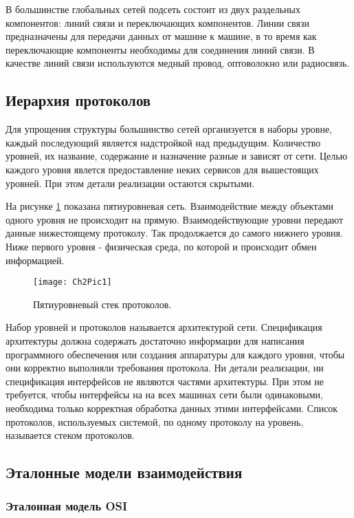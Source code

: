     В большинстве глобальных сетей подсеть состоит из двух раздельных компонентов: линий связи и переключающих компонентов. Линии связи предназначены для передачи данных от машине к машине, в то время как переключающие компоненты необходимы для соединения линий связи. В качестве линий связи используются медный провод, оптоволокно или радиосвязь.

    \subsection{Иерархия протоколов }

    Для упрощения структуры большинство сетей организуется в наборы уровне, каждый последующий является надстройкой над предыдущим. Количество уровней, их название, содержание и назначение разные и зависят от сети. Целью каждого уровня явлется предоставление неких сервисов для вышестоящих уровней. При этом детали реализации остаются скрытыми.

    На рисунке \ref{Pic1} показана пятиуровневая сеть. Взаимодействие между объектами одного уровня не происходит на прямую. Взаимодействующие уровни передают данные нижестоящему протоколу. Так продолжается до самого нижнего уровня. Ниже первого уровня - физическая среда, по которой и происходит обмен информацией.

    \begin{figure}
        \texttt{[image: Ch2Pic1]}
        \caption{Пятиуровневый стек протоколов.} \label{Pic1}
    \end{figure}

    Набор уровней и протоколов называется архитектурой сети. Спецификация архитектуры должна содержать достаточно информации для написания программного обеспечения или создания аппаратуры для каждого уровня, чтобы они корректно выполняли требования протокола. Ни детали реализации, ни спецификация интерфейсов не являются частями архитектуры. При этом не требуется, чтобы интерфейсы на на всех машинах сети были одинаковыми, необходима только корректная обработка данных этими интерфейсами. Список протоколов, используемых системой, по одному протоколу на уровень, называется стеком протоколов.

    \subsection{Эталонные модели взаимодействия}

    \subsubsection{Эталонная модель OSI}


